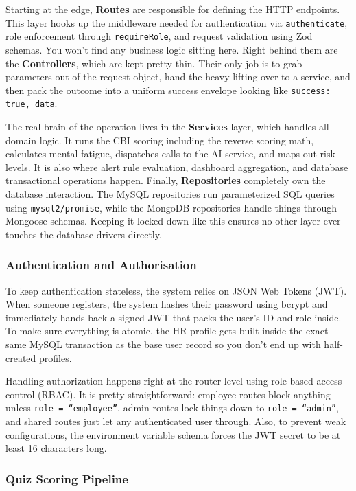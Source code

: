 \documentclass[12pt,a4paper]{article}
\begin{document}
Starting at the edge, \textbf{Routes} are responsible for defining the HTTP endpoints. This layer hooks up the middleware needed for authentication via \texttt{authenticate}, role enforcement through \texttt{requireRole}, and request validation using Zod schemas. You won't find any business logic sitting here. Right behind them are the \textbf{Controllers}, which are kept pretty thin. Their only job is to grab parameters out of the request object, hand the heavy lifting over to a service, and then pack the outcome into a uniform success envelope looking like \texttt{{success: true, data}}.

The real brain of the operation lives in the \textbf{Services} layer, which handles all domain logic. It runs the CBI scoring including the reverse scoring math, calculates mental fatigue, dispatches calls to the AI service, and maps out risk levels. It is also where alert rule evaluation, dashboard aggregation, and database transactional operations happen. Finally, \textbf{Repositories} completely own the database interaction. The MySQL repositories run parameterized SQL queries using \texttt{mysql2/promise}, while the MongoDB repositories handle things through Mongoose schemas. Keeping it locked down like this ensures no other layer ever touches the database drivers directly.

\subsubsection{Authentication and Authorisation}

To keep authentication stateless, the system relies on JSON Web Tokens (JWT). When someone registers, the system hashes their password using bcrypt and immediately hands back a signed JWT that packs the user's ID and role inside. To make sure everything is atomic, the HR profile gets built inside the exact same MySQL transaction as the base user record so you don't end up with half-created profiles.

Handling authorization happens right at the router level using role-based access control (RBAC). It is pretty straightforward: employee routes block anything unless \texttt{role = ``employee''}, admin routes lock things down to \texttt{role = ``admin''}, and shared routes just let any authenticated user through. Also, to prevent weak configurations, the environment variable schema forces the JWT secret to be at least 16 characters long.

\subsubsection{Quiz Scoring Pipeline}
\end{document}
